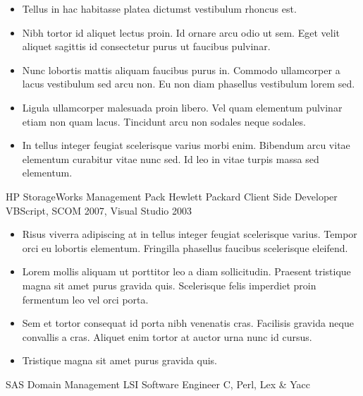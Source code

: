 \documentclass[10pt, a4paper]{cvhari}
\begin{document}
            \begin{itemize}
                \item Tellus in hac habitasse platea dictumst vestibulum rhoncus est.\smallskip
                \item Nibh tortor id aliquet lectus proin. Id ornare arcu odio ut sem. Eget velit aliquet sagittis id consectetur purus ut faucibus pulvinar.\smallskip
                \item Nunc lobortis mattis aliquam faucibus purus in. Commodo ullamcorper a lacus vestibulum sed arcu non. Eu non diam phasellus vestibulum lorem sed.\smallskip
                \item Ligula ullamcorper malesuada proin libero. Vel quam elementum pulvinar etiam non quam lacus. Tincidunt arcu non sodales neque sodales.\smallskip
                \item In tellus integer feugiat scelerisque varius morbi enim. Bibendum arcu vitae elementum curabitur vitae nunc sed. Id leo in vitae turpis massa sed elementum.\smallskip
            \end{itemize}

        \dividergray
        
        \project
            {HP StorageWorks Management Pack}
            {Hewlett Packard}
            {Client Side Developer}
            {VBScript, SCOM 2007, Visual Studio 2003}
        
            \begin{itemize}
                \item Risus viverra adipiscing at in tellus integer feugiat scelerisque varius. Tempor orci eu lobortis elementum. Fringilla phasellus faucibus scelerisque eleifend.\smallskip
                \item Lorem mollis aliquam ut porttitor leo a diam sollicitudin. Praesent tristique magna sit amet purus gravida quis. Scelerisque felis imperdiet proin fermentum leo vel orci porta.\smallskip
                \item Sem et tortor consequat id porta nibh venenatis cras. Facilisis gravida neque convallis a cras. Aliquet enim tortor at auctor urna nunc id cursus.\smallskip
                \item Tristique magna sit amet purus gravida quis.\smallskip
            \end{itemize}

        \dividergray
        
        \project
            {SAS Domain Management}
            {LSI}
            {Software Engineer}
            {C, Perl, Lex \& Yacc}
        
\end{document}
